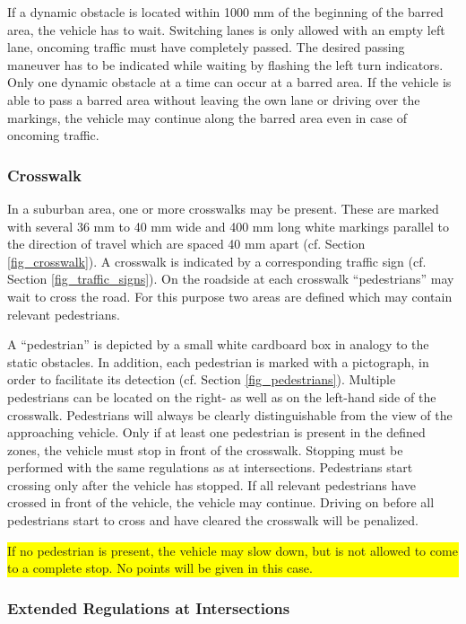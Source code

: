 If a dynamic obstacle is located within 1000 mm of the beginning of the barred
area, the vehicle has to wait. Switching lanes is only allowed with an empty
left lane, oncoming traffic must have completely passed. The desired passing
maneuver has to be indicated while waiting by flashing the left turn
indicators. Only one dynamic obstacle at a time can occur at a barred area. If
the vehicle is able to pass a barred area without leaving the own lane or
driving over the markings, the vehicle may continue along the barred area even
in case of oncoming traffic.

\subsubsection{Crosswalk}

In a suburban area, one or more crosswalks may be present. These are marked
with several 36 mm to 40 mm wide and 400 mm long white markings parallel to the
direction of travel which are spaced 40 mm apart (cf. Section
\ref{fig_crosswalk}). A crosswalk is indicated by a corresponding traffic sign
(cf. Section \ref{fig_traffic_signs}). On the roadside at each crosswalk
“pedestrians” may wait to cross the road. For this purpose two areas are
defined which may contain relevant pedestrians.

A “pedestrian” is depicted by a small white cardboard box in analogy to the
static obstacles. In addition, each pedestrian is marked with a pictograph, in
order to facilitate its detection (cf. Section \ref{fig_pedestrians}). Multiple
pedestrians can be located on the right- as well as on the left-hand side of
the crosswalk. Pedestrians will always be clearly distinguishable from the view
of the approaching vehicle. Only if at least one pedestrian is present in the
defined zones, the vehicle must stop in front of the crosswalk. Stopping must
be performed with the same regulations as at intersections. Pedestrians start
crossing only after the vehicle has stopped. If all relevant pedestrians have
crossed in front of the vehicle, the vehicle may continue. Driving on before
all pedestrians start to cross and have cleared the crosswalk will be
penalized.
\colorbox{yellow}{\parbox{\colorboxwidth}{If no pedestrian is present, the
	vehicle may slow down, but is not allowed to come to a complete stop.
	No points will be given in this case.}}

\subsubsection{Extended Regulations at Intersections}

